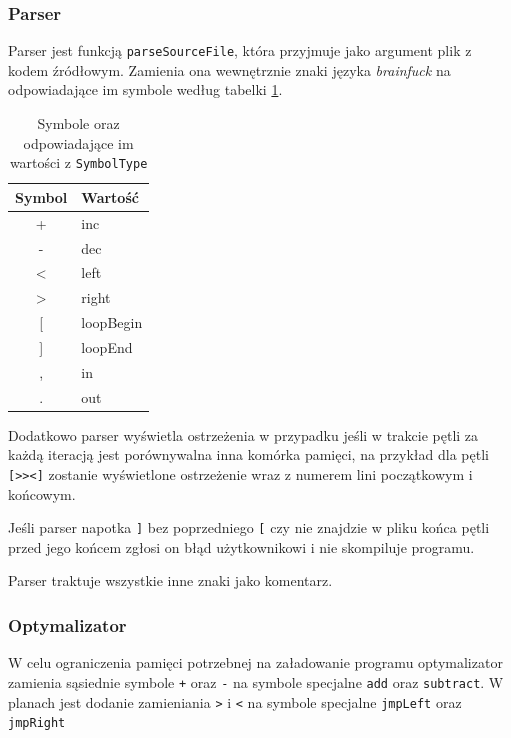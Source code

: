 \documentclass[a4paper,12pt]{article}
\begin{document}
    \subsubsection*{Parser}

    Parser jest funkcją \texttt{parseSourceFile}, która przyjmuje jako argument plik z kodem źródłowym. Zamienia ona wewnętrznie znaki języka \emph{brainfuck} na odpowiadające im symbole według tabelki \ref{tab:symbole}.

    \begin{table}[H]
        \begin{tabular}{|c|l|}
            \hline
            Symbol         & Wartość   \\ \hline
            +              & inc       \\ \hline
            -              & dec       \\ \hline
            \textless{}    & left      \\ \hline
            \textgreater{} & right     \\ \hline
            {[}            & loopBegin \\ \hline
            {]}            & loopEnd   \\ \hline
            ,              & in        \\ \hline
            .              & out       \\ \hline
        \end{tabular}
        \centering
        \caption{Symbole oraz odpowiadające im wartości z \texttt{SymbolType}}
        \label{tab:symbole}
    \end{table}

    Dodatkowo parser wyświetla ostrzeżenia w przypadku jeśli w trakcie pętli za każdą iteracją jest porównywalna inna komórka pamięci, na przykład dla pętli \texttt{[>><]} zostanie wyświetlone ostrzeżenie wraz z numerem lini początkowym i końcowym.

    Jeśli parser napotka \texttt{]} bez poprzedniego \texttt{[} czy nie znajdzie w pliku końca pętli przed jego końcem zgłosi on błąd użytkownikowi i nie skompiluje programu.

    Parser traktuje wszystkie inne znaki jako komentarz.
    
    \subsubsection*{Optymalizator}

    W celu ograniczenia pamięci potrzebnej na załadowanie programu optymalizator zamienia sąsiednie symbole \texttt{+} oraz \texttt{-} na symbole specjalne \texttt{add} oraz \texttt{subtract}. W planach jest dodanie zamieniania \texttt{>} i \texttt{<} na symbole specjalne \texttt{jmpLeft} oraz \texttt{jmpRight}
\end{document}
